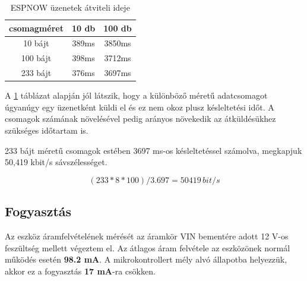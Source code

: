 \begin{table}[ht]
	\footnotesize
	\centering
	\begin{tabular}{| c | c | c | }
		\toprule
		csomagméret & 10 db & 100 db \\
		\midrule
        10 bájt & 389ms & 3850ms  \\
        \hline
        100 bájt & 398ms & 3712ms  \\
        \hline
		233 bájt & 376ms & 3697ms \\
		\bottomrule
	\end{tabular}
	\caption{ESPNOW üzenetek átviteli ideje}
	\label{tab:esp_now_measurements}
\end{table}

A \ref{tab:esp_now_measurements} táblázat alapján jól látszik, hogy a különböző méretű adatcsomagot úgyanúgy egy üzenetként küldi el és ez nem okoz plusz késleltetési időt. A csomagok számának növelésével pedig arányos növekedik az átküldésükhez szükséges időtartam is.

233 bájt méretű csomagok estében 3697 ms-os késleltetéssel számolva, megkapjuk 50,419 kbit/s sávszélességet.

\[ (233 * 8 * 100) / 3.697 =  50419 \, bit/s \]

\subsection{Fogyasztás}
Az eszköz áramfelvételének mérését az áramkör VIN bementére adott 12 V-os feszültség mellett végeztem el. Az átlagos áram felvétele az eszközönek normál működés esetén \textbf{98.2 mA}. A mikrokontrollert mély alvó állapotba helyezzük, akkor ez a fogyasztás \textbf{17 mA}-ra csökken.
